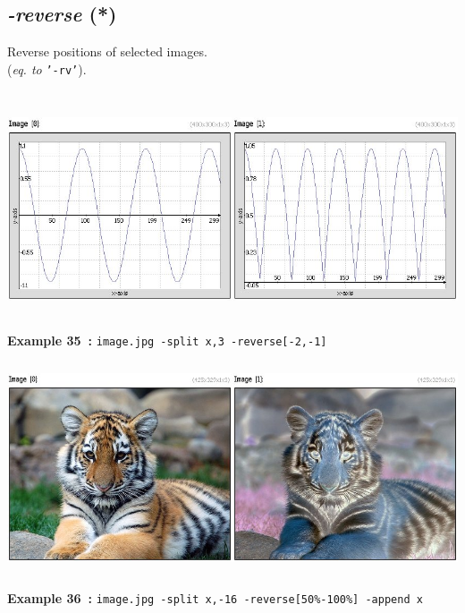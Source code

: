 \documentclass[a4paper,11pt,twoside]{book}
\begin{document}
\subsection{\emph{-reverse} (*)}\vspace*{-0.5em}
Reverse positions of selected images.
~\\(\emph{eq. to} {\small \texttt{'-rv'}}).
\begin{center}\includegraphics[keepaspectratio=true,height=7cm,width=\textwidth]{img/gmic_def35.jpg}\\
{\footnotesize \textbf{Example 35~:} \texttt{image.jpg -split x,3 -reverse[-2,-1]}}
\\\includegraphics[keepaspectratio=true,height=7cm,width=\textwidth]{img/gmic_def36.jpg}\\
{\footnotesize \textbf{Example 36~:} \texttt{image.jpg -split x,-16 -reverse[50\%-100\%] -append x}}
\end{center}
\end{document}
